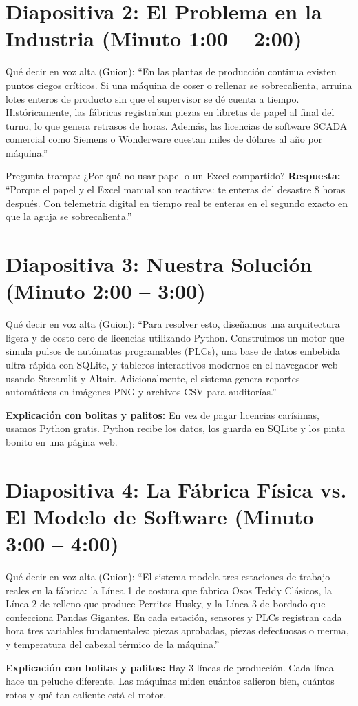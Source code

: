 \documentclass[10pt,letterpaper]{article}
\begin{document}
\section*{Diapositiva 2: El Problema en la Industria (Minuto 1:00 -- 2:00)}
\begin{guionbox}{Qué decir en voz alta (Guion):}
``En las plantas de producción continua existen puntos ciegos críticos. Si una máquina de coser o rellenar se sobrecalienta, arruina lotes enteros de producto sin que el supervisor se dé cuenta a tiempo. Históricamente, las fábricas registraban piezas en libretas de papel al final del turno, lo que genera retrasos de horas. Además, las licencias de software SCADA comercial como Siemens o Wonderware cuestan miles de dólares al año por máquina.''
\end{guionbox}
\begin{trampa}{Pregunta trampa: ¿Por qué no usar papel o un Excel compartido?}
\textbf{Respuesta:} ``Porque el papel y el Excel manual son reactivos: te enteras del desastre 8 horas después. Con telemetría digital en tiempo real te enteras en el segundo exacto en que la aguja se sobrecalienta.''
\end{trampa}

\section*{Diapositiva 3: Nuestra Solución (Minuto 2:00 -- 3:00)}
\begin{guionbox}{Qué decir en voz alta (Guion):}
``Para resolver esto, diseñamos una arquitectura ligera y de costo cero de licencias utilizando Python. Construimos un motor que simula pulsos de autómatas programables (PLCs), una base de datos embebida ultra rápida con SQLite, y tableros interactivos modernos en el navegador web usando Streamlit y Altair. Adicionalmente, el sistema genera reportes automáticos en imágenes PNG y archivos CSV para auditorías.''
\end{guionbox}
\textbf{Explicación con bolitas y palitos:} En vez de pagar licencias carísimas, usamos Python gratis. Python recibe los datos, los guarda en SQLite y los pinta bonito en una página web.

\section*{Diapositiva 4: La Fábrica Física vs. El Modelo de Software (Minuto 3:00 -- 4:00)}
\begin{guionbox}{Qué decir en voz alta (Guion):}
``El sistema modela tres estaciones de trabajo reales en la fábrica: la Línea 1 de costura que fabrica Osos Teddy Clásicos, la Línea 2 de relleno que produce Perritos Husky, y la Línea 3 de bordado que confecciona Pandas Gigantes. En cada estación, sensores y PLCs registran cada hora tres variables fundamentales: piezas aprobadas, piezas defectuosas o merma, y temperatura del cabezal térmico de la máquina.''
\end{guionbox}
\textbf{Explicación con bolitas y palitos:} Hay 3 líneas de producción. Cada línea hace un peluche diferente. Las máquinas miden cuántos salieron bien, cuántos rotos y qué tan caliente está el motor.
\end{document}
